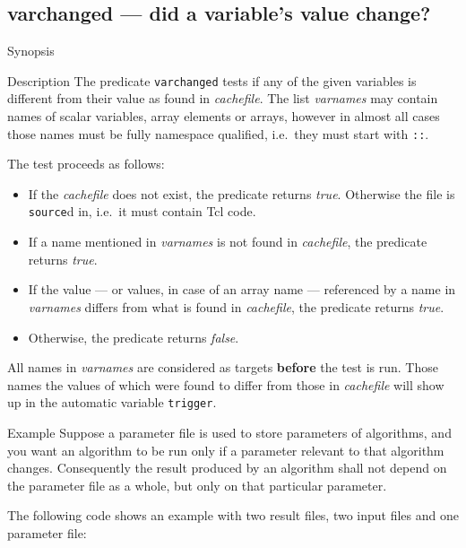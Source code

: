 \documentclass[11pt,bibtotoc,idxtotoc]{scrreprt}
\begin{document}
\subsection{varchanged --- did a variable's value change?}
\begin{Describe}
\item[Synopsis]   
\item[Description] The predicate \texttt{varchanged} tests if any of
  the given variables is different from their value as found in
  \textit{cachefile}. The list \textit{varnames} may contain names of
  scalar variables, array elements or arrays, however in almost all
  cases those names must be fully namespace qualified, i.e.\ they
  must start with \texttt{::}.

  The test proceeds as follows:
  \begin{itemize}
  \item If the \textit{cachefile} does not exist, the predicate
    returns \textit{true}. Otherwise the file is \texttt{source}d in,
    i.e.\ it must contain Tcl code.
  \item If a name mentioned in \textit{varnames} is not found in
    \textit{cachefile}, the predicate returns \textit{true}.
  \item If the value --- or values, in case of an array name ---
    referenced by a name in \textit{varnames} differs from what is
    found in \textit{cachefile}, the predicate returns \textit{true}.
  \item Otherwise, the predicate returns \textit{false}.
  \end{itemize}
  
  All names in \textit{varnames} are considered as targets
  \textbf{before} the test is run. Those names the values of which
  were found to differ from those in \textit{cachefile} will show up
  in the automatic variable \texttt{trigger}.

\item[Example]
  Suppose a parameter file is used to store parameters of
  algorithms, and you want an algorithm to be run only if a parameter
  relevant to that algorithm changes. Consequently the result produced by 
  an algorithm shall not depend on the parameter file as a whole, but
  only on that particular parameter.

  The following code shows an example with two result files, two input 
  files and one parameter file:
  \begingroup\small
  
  \endgroup


\end{Describe}
\end{document}
